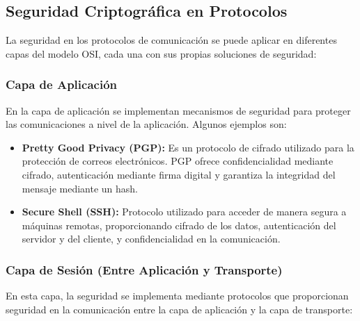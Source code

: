 \documentclass[a4paper,12pt]{article}
\begin{document}
\subsection*{Seguridad Criptográfica en Protocolos}

La seguridad en los protocolos de comunicación se puede aplicar en diferentes capas del modelo OSI, cada una con sus propias soluciones de seguridad:

\subsubsection*{Capa de Aplicación}

En la capa de aplicación se implementan mecanismos de seguridad para proteger las comunicaciones a nivel de la aplicación. Algunos ejemplos son:

\begin{itemize}
    \item \textbf{Pretty Good Privacy (PGP):} Es un protocolo de cifrado utilizado para la protección de correos electrónicos. PGP ofrece confidencialidad mediante cifrado, autenticación mediante firma digital y garantiza la integridad del mensaje mediante un hash.
    \item \textbf{Secure Shell (SSH):} Protocolo utilizado para acceder de manera segura a máquinas remotas, proporcionando cifrado de los datos, autenticación del servidor y del cliente, y confidencialidad en la comunicación.
\end{itemize}

\subsubsection*{Capa de Sesión (Entre Aplicación y Transporte)}

En esta capa, la seguridad se implementa mediante protocolos que proporcionan seguridad en la comunicación entre la capa de aplicación y la capa de transporte:
\end{document}
